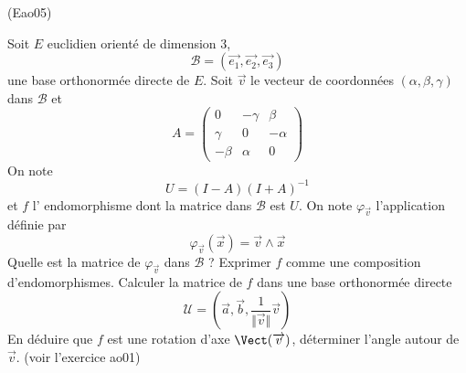 \begin{tiny}(Eao05)\end{tiny}
Soit $E$ euclidien orienté de dimension 3,
\[\mathcal{B}=(
\overrightarrow{e_{1}},\overrightarrow{e_{2}},\overrightarrow{e_{3}})\]
une base orthonormée directe de $E$. Soit $\overrightarrow{v}$ le vecteur de coordonnées $(\alpha ,\beta,\gamma )$ dans $\mathcal{B}$ et 
\begin{displaymath}
A=
\begin{pmatrix}
0 & -\gamma  & \beta  \\
\gamma  & 0 & -\alpha  \\
-\beta  & \alpha  & 0
\end{pmatrix} 
\end{displaymath}
On note 
\begin{displaymath}
U=(I-A)(I+A)^{-1} 
\end{displaymath}
et $f$ l' endomorphisme dont la matrice dans $\mathcal{B}$ est $U$.\newline
On note $\varphi_{\overrightarrow{v}}$ l'application définie par
\begin{displaymath}
 \varphi_{\overrightarrow{v}}(\overrightarrow{x}) = \overrightarrow{v}\wedge \overrightarrow{x} 
\end{displaymath}
Quelle est la matrice de  $\varphi_{\overrightarrow{v}}$ dans $\mathcal B$ ? Exprimer $f$ comme une composition d'endomorphismes. Calculer la matrice de $f$ dans une base orthonormée directe 
\begin{displaymath}
\mathcal U=(\overrightarrow{a},\overrightarrow{b},\frac{1}{\Vert \overrightarrow{v}\Vert}\overrightarrow{v}) 
\end{displaymath}
En déduire que $f$ est une rotation d'axe $\Vect(\overrightarrow{v})$, déterminer l'angle autour de $\overrightarrow{v}$.\newline
(voir l'exercice ao01)